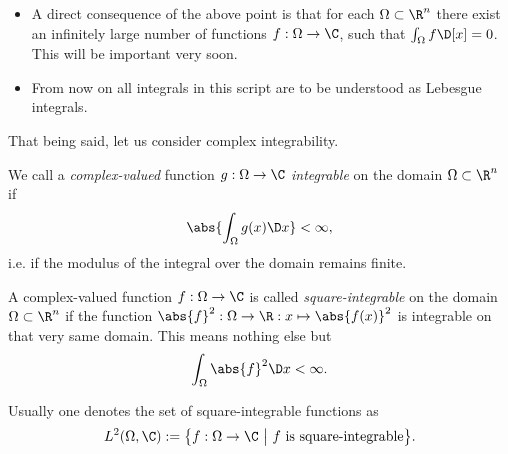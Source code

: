 \begin{rem}
\begin{itemize}
			For higher dimensions analogous statements are true:
			e.g. for integrals over subsets of $\R^2$, we can change the value of the integrand at up to countably infinite number of lines or points; 
			similarly for 3D integrals at planes, lines or points, \ldots. 
			Often this allows us to alter an integrand in a way that integration in a Riemann sense is possible. 
			For example in the first integral of \eqref{exampleLebesqueIntegral}, we changed the points where the function is 1 to 0 in order to get a Riemann-integrable version. 
			This is possible since $\set{Q}$ is a set with only up to countably infinite number of elements\footnote{It is not necessarily intuitive to understand, what this means. Just imagine there are two kinds of infinities: For one kind one can abstractly speaking find a way to enumerate each element (the ``countable infinity''), for the other one this is not possible.}.
		\item A direct consequence of the above point is that for each $\Omega \subset \R^n$ there exist an infinitely large number of functions $f : \Omega \to \C$, such that $\int_\Omega f \D[x] = 0$. This will be important very soon.
		\item From now on all integrals in this script are to be understood as Lebesgue integrals.
	\end{itemize}
\end{rem}

\noindent
That being said, let us consider complex integrability. 
\begin{defn}
We call a \emph{complex-valued} function $g : \Omega \to \C$ \emph{integrable} on the domain $\Omega \subset \R^n$ if
	\begin{equation}
		\abs{ \int_\Omega g(x) \D x } < \infty,
		\label{defIntegrable}
	\end{equation}
i.e. if the modulus of the integral over the domain remains finite. 
\end{defn}
\begin{defn}
	A complex-valued function $f : \Omega \to \C$ is called \emph{square-integrable} on the domain $\Omega \subset \R^n$ if
	the function $\abs{f}^2 : \Omega \to \R : x \mapsto \abs{f(x)}^2$ is integrable on that very same domain. 
	This means nothing else but 
	\[ \int_\Omega \abs{f}^2 \D x < \infty. \]
\end{defn}

\begin{nte}
	Usually one denotes the set of square-integrable functions as
	\begin{equation} 
		L^2(\Omega, \C) := \big\{ f : \Omega \to \C~\big|~\text{$f$ is square-integrable} \big\}.
		\label{defL2}
	\end{equation}
\end{nte}

